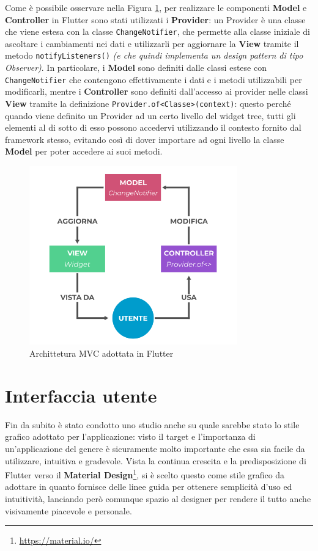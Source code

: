 Come è possibile osservare nella Figura \ref{fig:MVC_Flutter}, per realizzare le componenti \textbf{Model} e \textbf{Controller} in Flutter sono stati utilizzati i \textbf{Provider}: un Provider è una classe che viene estesa con la classe \texttt{ChangeNotifier}, che permette alla classe iniziale di ascoltare i cambiamenti nei dati e utilizzarli per aggiornare la \textbf{View} tramite il metodo \texttt{notifyListeners()} \textit{(e che quindi implementa un design pattern di tipo Observer)}. In particolare, i \textbf{Model} sono definiti dalle classi estese con \texttt{ChangeNotifier} che contengono effettivamente i dati e i metodi utilizzabili per modificarli, mentre i \textbf{Controller} sono definiti dall'accesso ai provider nelle classi \textbf{View} tramite la definizione \texttt{Provider.of<Classe>(context)}: questo perché quando viene definito un Provider ad un certo livello del widget tree, tutti gli elementi al di sotto di esso possono accedervi utilizzando il contesto fornito dal framework stesso, evitando così di dover importare ad ogni livello la classe \textbf{Model} per poter accedere ai suoi metodi.

\begin{figure}[h]
\centering
\includegraphics[width=0.8\textwidth]{img/MVC_Flutter}
\caption{Archittetura MVC adottata in Flutter}
\label{fig:MVC_Flutter}
\end{figure}

\section{Interfaccia utente}
Fin da subito è stato condotto uno studio anche su quale sarebbe stato lo stile grafico adottato per l'applicazione: visto il target e l'importanza di un'applicazione del genere è sicuramente molto importante che essa sia facile da utilizzare, intuitiva e gradevole.
Vista la continua crescita e la predisposizione di Flutter verso il \textbf{Material Design}\footnote{\url{https://material.io/}}, si è scelto questo come stile grafico da adottare in quanto fornisce delle linee guida per ottenere semplicità d'uso ed intuitività, lanciando però comunque spazio al designer per rendere il tutto anche visivamente piacevole e personale.

